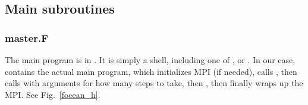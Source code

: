 \subsection{Main subroutines}

\subsubsection{master.F}
The main program is in . It is simply a shell, including
one of ,  or . In
our case,  contains the actual main program, which
initializes MPI (if needed), calls , then
calls  with arguments for how many steps to take,
then , then finally wraps up the MPI.
See Fig.\ \ref{focean_h}.

